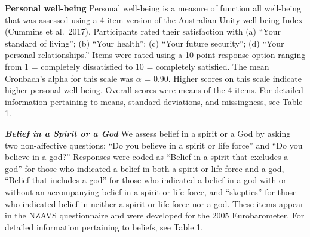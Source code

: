 \documentclass[
  english,
  man]{apa6}
\begin{document}
\textbf{Personal well-being} Personal well-being is a measure of function all well-being that was assessed using a 4-item version of the Australian Unity well-being Index (Cummins et al.~2017). Participants rated their satisfaction with (a) \enquote{Your standard of living}; (b) \enquote{Your health}; (c) \enquote{Your future security}; (d) \enquote{Your personal relationships.} Items were rated using a 10-point response option ranging from 1 = completely dissatisfied to 10 = completely satisfied. The mean Cronbach's alpha for this scale was \(\alpha\) = 0.90. Higher scores on this scale indicate higher personal well-being. Overall scores were means of the 4-items. For detailed information pertaining to means, standard deviations, and missingness, see Table 1.

\textbf{\emph{Belief in a Spirit or a God}} We assess belief in a spirit or a God by asking two non-affective questions: \enquote{Do you believe in a spirit or life force} and \enquote{Do you believe in a god?} Responses were coded as \enquote{Belief in a spirit that excludes a god} for those who indicated a belief in both a spirit or life force and a god, \enquote{Belief that includes a god} for those who indicated a belief in a god with or without an accompanying belief in a spirit or life force, and \enquote{skeptics} for those who indicated belief in neither a spirit or life force nor a god. These items appear in the NZAVS questionnaire and were developed for the 2005 Eurobarometer. For detailed information pertaining to beliefs, see Table 1.
\end{document}
